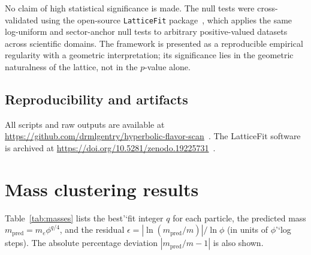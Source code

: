 \documentclass[12pt]{article}
\theoremstyle{definition}
\begin{document}
No claim of high statistical significance is made. The null tests were cross-validated using the open-source \texttt{LatticeFit} package~\cite{Gentry:LatticeFit}, which applies the same log-uniform and sector-anchor null tests to arbitrary positive-valued datasets across scientific domains. The framework is presented as a reproducible empirical regularity with a geometric interpretation; its significance lies in the geometric naturalness of the lattice, not in the $p$-value alone.

\subsection{Reproducibility and artifacts}
All scripts and raw outputs are available at \url{https://github.com/drmlgentry/hyperbolic-flavor-scan}~\cite{Gentry:Scan}. The LatticeFit software is archived at \url{https://doi.org/10.5281/zenodo.19225731}~\cite{Gentry:LatticeFit}.

\section{Mass clustering results}
\label{sec:mass_results}

Table~\ref{tab:masses} lists the best'`fit integer $q$ for each particle, the predicted mass $m_{\text{pred}} = m_e \phi^{q/4}$, and the residual $\epsilon = |\ln(m_{\text{pred}}/m)|/\ln\phi$ (in units of $\phi$'`log steps). The absolute percentage deviation $|m_{\text{pred}}/m - 1|$ is also shown.
\end{document}
